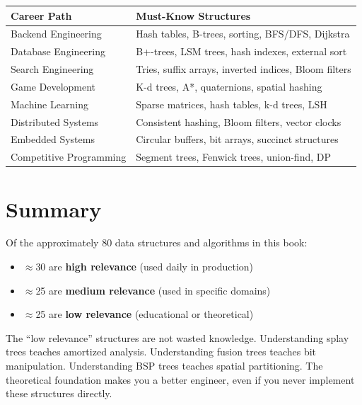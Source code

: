 \begin{center}
\small
\begin{tabular}{ll}
\toprule
\textbf{Career Path} & \textbf{Must-Know Structures} \\
\midrule
Backend Engineering & Hash tables, B-trees, sorting, BFS/DFS, Dijkstra \\
Database Engineering & B+-trees, LSM trees, hash indexes, external sort \\
Search Engineering & Tries, suffix arrays, inverted indices, Bloom filters \\
Game Development & K-d trees, A*, quaternions, spatial hashing \\
Machine Learning & Sparse matrices, hash tables, k-d trees, LSH \\
Distributed Systems & Consistent hashing, Bloom filters, vector clocks \\
Embedded Systems & Circular buffers, bit arrays, succinct structures \\
Competitive Programming & Segment trees, Fenwick trees, union-find, DP \\
\bottomrule
\end{tabular}
\end{center}


\section{Summary}

Of the approximately 80 data structures and algorithms in this book:
\begin{itemize}
    \item $\approx$30 are \textbf{high relevance} (used daily in production)
    \item $\approx$25 are \textbf{medium relevance} (used in specific domains)
    \item $\approx$25 are \textbf{low relevance} (educational or theoretical)
\end{itemize}

The ``low relevance'' structures are not wasted knowledge. Understanding splay trees teaches amortized analysis. Understanding fusion trees teaches bit manipulation. Understanding BSP trees teaches spatial partitioning. The theoretical foundation makes you a better engineer, even if you never implement these structures directly.

